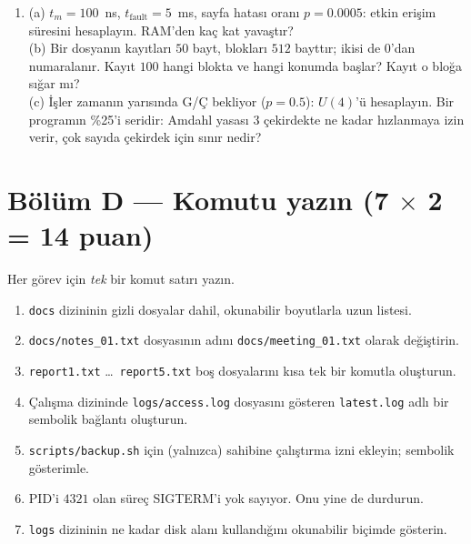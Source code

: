 \documentclass[11pt,a4paper]{article}
\begin{document}
\begin{enumerate}[leftmargin=1.8em,label=C\arabic*.]
  \item (a) $t_m = 100$~ns, $t_{\text{fault}} = 5$~ms, sayfa hatası oranı $p = 0.0005$: etkin erişim süresini hesaplayın. RAM'den kaç kat yavaştır? \\
  (b) Bir dosyanın kayıtları $50$ bayt, blokları $512$ bayttır; ikisi de $0$'dan numaralanır. Kayıt $100$ hangi blokta ve hangi konumda başlar? Kayıt o bloğa sığar mı? \\
  (c) İşler zamanın yarısında G/Ç bekliyor ($p = 0.5$): $U(4)$'ü hesaplayın. Bir programın \%25'i seridir: Amdahl yasası $3$ çekirdekte ne kadar hızlanmaya izin verir, çok sayıda çekirdek için sınır nedir? 
  \ans{6.0cm}
\end{enumerate}

\newpage
\section*{Bölüm D --- Komutu yazın \hfill (7 $\times$ 2 = 14 puan)}
Her görev için \emph{tek} bir komut satırı yazın.
\begin{enumerate}[leftmargin=1.8em,label=D\arabic*.]
  \item \texttt{docs} dizininin gizli dosyalar dahil, okunabilir boyutlarla uzun listesi. \ans{0.9cm}
  \item \texttt{docs/notes\_01.txt} dosyasının adını \texttt{docs/meeting\_01.txt} olarak değiştirin. \ans{0.9cm}
  \item \texttt{report1.txt} \dots\ \texttt{report5.txt} boş dosyalarını kısa tek bir komutla oluşturun. \ans{0.9cm}
  \item Çalışma dizininde \texttt{logs/access.log} dosyasını gösteren \texttt{latest.log} adlı bir sembolik bağlantı oluşturun. \ans{0.9cm}
  \item \texttt{scripts/backup.sh} için (yalnızca) sahibine çalıştırma izni ekleyin; sembolik gösterimle. \ans{0.9cm}
  \item PID'i $4321$ olan süreç SIGTERM'i yok sayıyor. Onu yine de durdurun. \ans{0.9cm}
  \item \texttt{logs} dizininin ne kadar disk alanı kullandığını okunabilir biçimde gösterin. \ans{0.9cm}
\end{enumerate}
\end{document}
